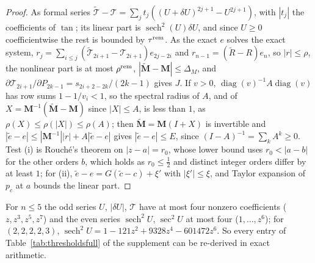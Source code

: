 \documentclass[pdflatex,sn-mathphys-num]{sn-jnl}
\theoremstyle{thmstyleone}%
\theoremstyle{thmstylethree}%
\begin{document}
\begin{proof}
As formal series $\tilde{\mathcal T}-\mathcal T=\sum_jt_j((U+\delta U)^{2j+1}-U^{2j+1})$, with $|t_j|$ the coefficients of $\tan$; its linear part is $\operatorname{sech}^2(U)\delta U$, and since $U\ge0$ coefficientwise the rest is bounded by $\tau^{\rm rem}$. As the exact $e$ solves the exact system, $r_j=\sum_{i\le j}(\tilde{\mathcal T}_{2i+1}-\mathcal T_{2i+1})e_{2j-2i}$ and $r_{n-1}=(\tilde R-R)e_n$, so $|r|\le\rho$, the nonlinear part is at most $\rho^{\rm rem}$, $|\tilde{\mathbf M}-\mathbf M|\le\Delta_M$, and $\partial\mathcal T_{2i+1}/\partial P_{2k-1}=s_{2i+2-2k}/(2k-1)$ gives $J$. If $v>0$, $\operatorname{diag}(v)^{-1}A\operatorname{diag}(v)$ has row sums $1-1/v_i<1$, so the spectral radius of $A$, and of $X=\mathbf M^{-1}(\tilde{\mathbf M}-\mathbf M)$ since $|X|\le A$, is less than $1$, as $\rho(X)\le\rho(|X|)\le\rho(A)$; then $\tilde{\mathbf M}=\mathbf M(I+X)$ is invertible and $|\tilde e-e|\le|\mathbf M^{-1}||r|+A|\tilde e-e|$ gives $|\tilde e-e|\le E$, since $(I-A)^{-1}=\sum_kA^k\ge0$. Test (i) is Rouch\'e's theorem on $|z-a|=r_0$, whose lower bound uses $r_0<|a-b|$ for the other orders $b$, which holds as $r_0\le\frac12$ and distinct integer orders differ by at least $1$; for (ii), $\tilde e-e=G(\tilde c-c)+\xi'$ with $|\xi'|\le\xi$, and Taylor expansion of $p_c$ at $a$ bounds the linear part.
\end{proof}

For $n\le5$ the odd series $U$, $|\delta U|$, $\mathcal T$ have at most four nonzero coefficients ($z,z^3,z^5,z^7$) and the even series $\operatorname{sech}^2U$, $\sec^2U$ at most four ($1,\dots,z^6$); for $(2,2,2,2,3)$, $\operatorname{sech}^2U=1-121z^2+9328z^4-601472z^6$. So every entry of Table~\ref{tab:thresholdsfull} of the supplement can be re-derived in exact arithmetic.
\end{document}
